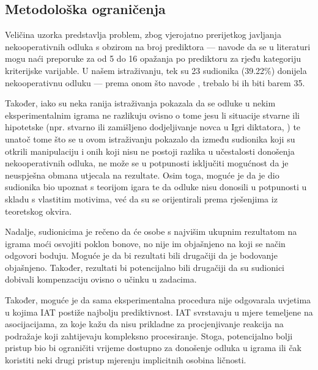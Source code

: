 \documentclass[a4paper, 12pt]{report}
\begin{document}
\subsection{Metodološka ograničenja}

Veličina uzorka predstavlja problem, zbog vjerojatno prerijetkog javljanja
nekooperativnih odluka s obzirom na broj prediktora --- \citet{orme2009multiple}
navode da se u literaturi mogu naći preporuke za od 5 do 16 opažanja po prediktoru za
rjeđu kategoriju kriterijske varijable. U našem istraživanju, tek su 23 sudionika
(39.22\%) donijela nekooperativnu odluku --- prema onom što navode
\citet{orme2009multiple}, trebalo bi ih biti barem 35. 

Također, iako su neka ranija istraživanja pokazala da se
odluke u nekim eksperimentalnim igrama ne razlikuju ovisno o tome jesu li
situacije stvarne ili hipotetske (npr. stvarno ili zamišljeno dodjeljivanje
novca u Igri diktatora, \citealp{ben2008economic}) te unatoč tome što se
u ovom istraživanju pokazalo da između sudionika koji su otkrili manipulaciju i
onih koji nisu ne postoji razlika u učestalosti donošenja nekooperativnih
odluka, ne može se u potpunosti isključiti mogućnost da je neuspješna obmana
utjecala na rezultate. Osim toga, moguće je da je dio sudionika bio upoznat s
teorijom igara te da odluke nisu donosili u potpunosti u skladu s vlastitim
motivima, već da su se orijentirali prema rješenjima iz teoretskog okvira. 

Nadalje, sudionicima je rečeno da će osobe s najvišim ukupnim rezultatom na
igrama moći osvojiti poklon bonove, no nije im objašnjeno na koji se način
odgovori boduju. Moguće je da bi rezultati bili drugačiji da je bodovanje
objašnjeno. Također, rezultati bi potencijalno bili drugačiji da su sudionici
dobivali kompenzaciju ovisno o učinku u zadacima.

Također, moguće je da sama eksperimentalna procedura nije odgovarala uvjetima u
kojima IAT postiže najbolju prediktivnost. \citet{uhlmann2012getting} IAT
svrstavaju u mjere temeljene na asocijacijama, za koje kažu da nisu prikladne za
procjenjivanje reakcija na podražaje koji zahtijevaju kompleksno procesiranje.
Stoga, potencijalno bolji pristup bio bi ograničiti vrijeme dostupno za
donošenje odluka u igrama ili čak koristiti neki drugi pristup mjerenju
implicitnih osobina ličnosti.
\end{document}
